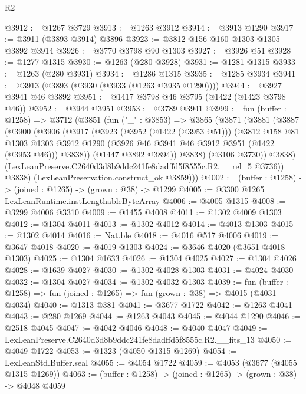 \begin{lexlean}{R2}
\begin{coremodule}
@3912 := @1267 @3729
@3913 := @1263 @3912
@3914 := @3913 @1290
@3917 := @3911 (@3893 @3914) @3896
@3923 := @3812 @156 @160 @1303 @1305 @3892 @3914
@3926 := @3770 @3798 @90 @1303
@3927 := @3926 @51
@3928 := @1277 @1315
@3930 := @1263 (@280 @3928)
@3931 := @1281 @1315
@3933 := @1263 (@280 @3931)
@3934 := @1286 @1315
@3935 := @1285 @3934
@3941 := @3913 (@3893 (@3930 (@3933 (@1263 @3935 @1290))))
@3944 := @3927 @3941 @46 @3892
@3951 := @1417 @3798 @46 @3795 (@1422 (@1423 @3798 @46))
@3952 := @3944 @3951
@3953 := @3789 @3941
@3999 := fun (buffer : @1258) =>
  @3712
    (@3851
      (fun ("_" : @3853) =>
      @3865
        (@3871
          (@3881
            (@3887
              (@3900
                (@3906
                  (@3917
                    (@3923
                      (@3952 (@1422 (@3953 @51)))
                      (@3812
                        @158
                        @81
                        @1303
                        @1303
                        @3912
                        @1290
                        (@3926 @46 @3941 @46 @3912 @3951 (@1422 (@3953 @46)))
                        @3838))
                    (@1447 @3892 @3894))
                  @3838)
                (@3106 @3730))
              @3838)
            (LexLeanPreserve.C2640d3d8b9ddc241fe8dadffd5f8555c.R2.__rel_5 @3736))
          @3838)
        (LexLeanPreservation.construct_ok @3859)))
@4002 := (buffer : @1258) -> (joined : @1265) -> (grown : @38) -> @1299
@4005 := @3300 @1265 LexLeanRuntime.instLengthableByteArray
@4006 := @4005 @1315
@4008 := @3299 @4006 @3310
@4009 := @1455 @4008
@4011 := @1302 @4009 @1303
@4012 := @1304 @4011
@4013 := @1302 @4012
@4014 := @4013 @1303
@4015 := @1302 @4014
@4016 := Nat.ble
@4018 := @4016 @517 @4006
@4019 := @3647 @4018
@4020 := @4019 @1303
@4024 := @3646 @4020 (@3651 @4018 @1303)
@4025 := @1304 @1633
@4026 := @1304 @4025
@4027 := @1304 @4026
@4028 := @1639 @4027
@4030 := @1302 @4028 @1303
@4031 := @4024 @4030
@4032 := @1304 @4027
@4034 := @1302 @4032 @1303
@4039 := fun (buffer : @1258) => fun (joined : @1265) => fun (grown : @38) => @4015 (@4031 @4034)
@4040 := @1313 @381
@4041 := @3677 @1722
@4042 := @1263 @4041
@4043 := @280 @1269
@4044 := @1263 @4043
@4045 := @4044 @1290
@4046 := @2518 @4045
@4047 := @4042 @4046
@4048 := @4040 @4047
@4049 := LexLeanPreserve.C2640d3d8b9ddc241fe8dadffd5f8555c.R2.__fits_13
@4050 := @4049 @1722
@4053 := @1323 (@4050 @1315 @1269)
@4054 := LexLeanStd.Buffer.seal
@4055 := @4054 @1722
@4059 := @4053 (@3677 (@4055 @1315 @1269))
@4063 := (buffer : @1258) -> (joined : @1265) -> (grown : @38) -> @4048 @4059

\end{coremodule}
\end{lexlean}
